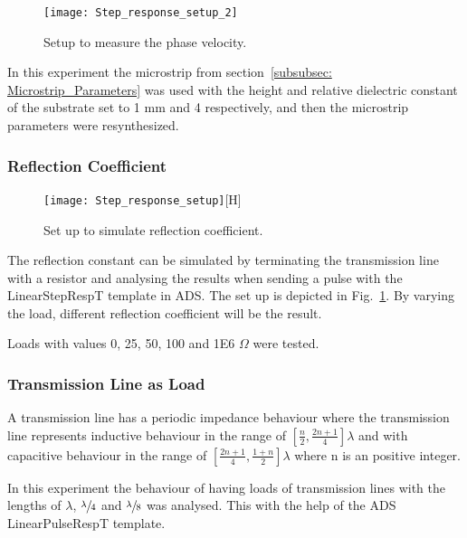 \documentclass[report.tex]{subfiles}
\begin{document}
\begin{figure}[H]
	\texttt{[image: Step\_response\_setup\_2]}
	\caption{Setup to measure the phase velocity.}
\end{figure}

In this experiment the microstrip from section~\ref{subsubsec: Microstrip_Parameters} was used with the height and relative dielectric constant of the substrate set to 1 mm and 4 respectively, and then the microstrip parameters were resynthesized.

\subsubsection{Reflection Coefficient}

\begin{figure}[h]
	\texttt{[image: Step\_response\_setup]}[H]
	\caption{Set up to simulate reflection coefficient.}\label{fig:Lab1 reflection coefficient}
\end{figure}

The reflection constant can be simulated by terminating the transmission line with a resistor and analysing the results when sending a pulse with the LinearStepRespT template in ADS. The set up is depicted in Fig.~\ref{fig:Lab1 reflection coefficient}. By varying the load, different reflection coefficient will be the result.

Loads with values 0, 25, 50, 100 and 1E6 $\Omega$ were tested.

\subsubsection{Transmission Line as Load}
A transmission line has a periodic impedance behaviour where the transmission line represents inductive behaviour in the range of $\left[ \frac{n}{2},\frac{2n + 1}{4} \right]\lambda$ and with capacitive behaviour in the range of $\left[\frac{2n + 1}{4},\frac{1 + n}{2} \right]\lambda$ where n is an positive integer.

In this experiment the behaviour of having loads of transmission lines with the lengths of $\lambda$, $\sfrac{\lambda}{4}$ and $\sfrac{\lambda}{8}$ was analysed. This with the help of the ADS LinearPulseRespT template.
\end{document}
